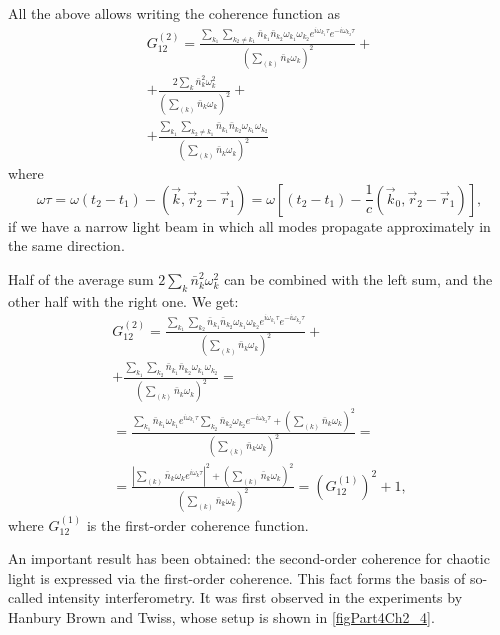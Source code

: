 All the above allows writing the coherence function as
\begin{eqnarray}
G_{12}^{(2)} = \frac{\sum_{k_1}\sum_{k_2 \neq k_1} \bar{n}_{k_1}
  \bar{n}_{k_2} \omega_{k_1} \omega_{k_2} e^{i \omega_{k_1} \tau} 
e^{- i \omega_{k_2} \tau} } 
{\left(\sum_{(k)} \bar{n}_k \omega_k\right)^2} + 
\nonumber \\
+
\frac{2 \sum_{k} \bar{n}_{k}^2 \omega_k^2} 
{\left(\sum_{(k)} \bar{n}_k \omega_k\right)^2} + 
\nonumber \\
+
\frac{\sum_{k_1}\sum_{k_2 \neq k_1} \bar{n}_{k_1}
  \bar{n}_{k_2} \omega_{k_1} \omega_{k_2}} 
{\left(\sum_{(k)} \bar{n}_k \omega_k\right)^2}
\label{eqCh4_37}
\end{eqnarray}
where
\[
\omega \tau = \omega \left(t_2 - t_1\right) - \left(\vec{k}, \vec{r}_2
- \vec{r}_1\right) = 
\omega \left[
\left(t_2 - t_1\right) - \frac{1}{c}\left(\vec{k}_0, \vec{r}_2
- \vec{r}_1\right)
\right],
\]
if we have a narrow light beam in which all modes propagate approximately in the same direction.

Half of the average sum $2 \sum_{k} \bar{n}_{k}^2 \omega_k^2$ can be combined with the left sum, and the other half with the right one. We get: 
\begin{eqnarray}
G_{12}^{(2)} = \frac{\sum_{k_1}\sum_{k_2} \bar{n}_{k_1}
  \bar{n}_{k_2} \omega_{k_1} \omega_{k_2} e^{i \omega_{k_1} \tau} 
e^{- i \omega_{k_2} \tau}} 
{\left(\sum_{(k)} \bar{n}_k \omega_k\right)^2} + 
\nonumber \\
+ \frac{\sum_{k_1}\sum_{k_2} \bar{n}_{k_1}
  \bar{n}_{k_2} \omega_{k_1} \omega_{k_2}} 
{\left(\sum_{(k)} \bar{n}_k \omega_k\right)^2} = 
\nonumber \\
= 
\frac{\sum_{k_1}\bar{n}_{k_1} \omega_{k_1} e^{i \omega_{k_1} \tau}
\sum_{k_2}\bar{n}_{k_2} \omega_{k_2} e^{- i \omega_{k_2} \tau} +
\left(\sum_{(k)} \bar{n}_k \omega_k\right)^2
}
{\left(\sum_{(k)} \bar{n}_k \omega_k\right)^2} = 
\nonumber \\
= \frac{\left|\sum_{(k)}\bar{n}_{k} \omega_{k} e^{i \omega_{k}
  \tau}\right|^2 + \left(\sum_{(k)} \bar{n}_k \omega_k\right)^2}
{\left(\sum_{(k)} \bar{n}_k \omega_k\right)^2} = 
\left(G_{12}^{(1)}\right)^2 + 1,
\label{eqCh4_38}
\end{eqnarray}
where $G_{12}^{(1)}$ is the first-order coherence function.  

An important result has been obtained: the second-order coherence for chaotic light is expressed via the first-order coherence. This fact forms the basis of so-called intensity interferometry. It was first observed in the experiments by Hanbury Brown and Twiss, whose setup is shown in \autoref{figPart4Ch2_4}.

